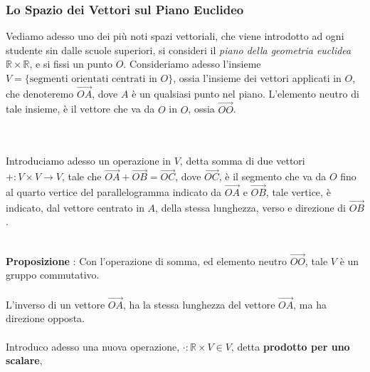 \documentclass[12pt, letterpaper]{article}
\newcommand{\R}{{\mathbb R}}
\newcommand{\acc}{\\\hphantom{}\\}
\begin{document}
\subsubsection{Lo Spazio dei Vettori sul Piano Euclideo}\label{v2O}
Vediamo adesso uno dei più noti spazi vettoriali, che viene introdotto ad ogni studente sin dalle scuole 
superiori, si consideri il \textit{piano della geometria euclidea} \(\R\times \R\), e si fissi un 
punto \(O\). Consideriamo adesso l'insieme \(V=\{\text{segmenti orientati centrati in } O\}\), ossia l'insieme 
dei vettori applicati in \(O\), che denoteremo \(\vec{OA}\), dove \(A\) è un qualsiasi punto nel piano. L'elemento neutro di tale insieme, è il vettore 
che va da \(O\) in \(O\), ossia \(\vec{OO}\).
\begin{figure}[h]
\end{figure}\acc
Introduciamo adesso un operazione in \(V\), detta somma di due vettori \(+ : V\times V \rightarrow V\), 
tale che  \(\vec{OA}+\vec{OB}=\vec{OC}\), dove \(\vec{OC}\), è il segmento che va da \(O\) fino al quarto 
vertice del parallelogramma indicato da \(\vec{OA}\) e \(\vec{OB}\), tale vertice, è indicato, 
dal vettore centrato in \(A\), della stessa lunghezza, verso e direzione di \(\vec{OB}\).\hphantom{}\acc
\begin{figure}[h]
\end{figure}
\textbf{Proposizione }: Con l'operazione di somma, ed elemento neutro \(\vec{OO}\), tale \(V\) è un 
gruppo commutativo.\acc 
L'inverso di un vettore \(\vec{OA}\), ha la stessa lunghezza del vettore \(\vec{OA}\), 
ma ha direzione opposta.\acc
Introduco adesso una nuova operazione, \(\cdot : \R\times V \in V\), detta \textbf{prodotto per uno scalare}, 
\end{document}
